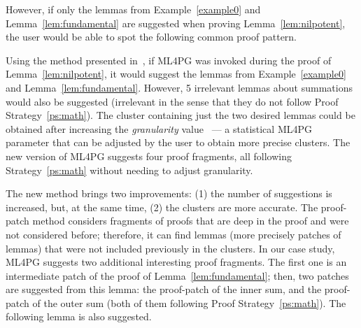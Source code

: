 However, if only the lemmas from Example~\ref{example0} and Lemma~\ref{lem:fundamental} are suggested when proving Lemma~\ref{lem:nilpotent}, the user would be able to
spot the following common proof pattern.





Using the method presented in~\cite{KHG13}, if ML4PG was invoked during the proof of Lemma~\ref{lem:nilpotent}, it would suggest the lemmas from Example~\ref{example0} and
Lemma~\ref{lem:fundamental}. However, 5 irrelevant lemmas
 about summations would also be suggested (irrelevant in the sense that they do not follow Proof Strategy~\ref{ps:math}). The cluster containing just the two desired lemmas could be obtained after
increasing the \emph{granularity} value~\cite{KHG13} --- a statistical ML4PG parameter that can be adjusted by the user to obtain more precise clusters. The new version of ML4PG suggests four proof fragments, all following Strategy~\ref{ps:math} without needing to adjust granularity.

The new method brings two improvements:
(1) the number of suggestions is increased, but, at the same time, (2)
the clusters are more accurate. The proof-patch method considers fragments of proofs that are deep in the proof and were not considered before; therefore, it can find lemmas (more precisely patches of lemmas) that were not
included previously in the clusters. In our case study, ML4PG suggests two additional interesting proof fragments. The first one is an intermediate patch of the proof of
Lemma~\ref{lem:fundamental}; then, two patches are suggested from this
lemma: the proof-patch of the inner sum, and the proof-patch of the outer sum (both of them following Proof Strategy~\ref{ps:math}). The following lemma is also
suggested.

